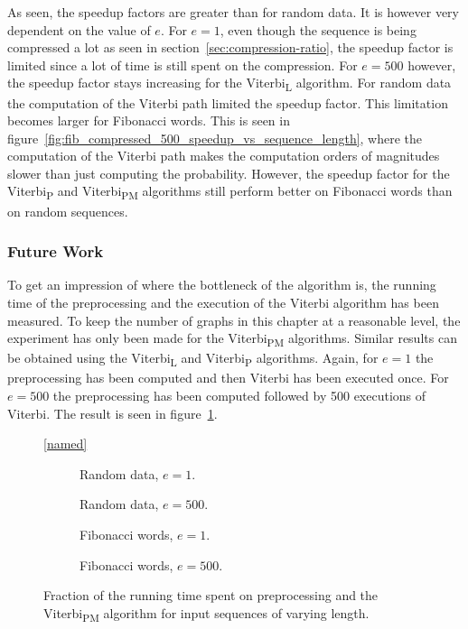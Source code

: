 As seen, the speedup factors are greater than for random data. It is however
very dependent on the value of $e$. For $e = 1$, even though the sequence is
being compressed a lot as seen in section~\ref{sec:compression-ratio}, the
speedup factor is limited since a lot of time is still spent on the
compression. For $e = 500$ however, the speedup factor stays increasing for the
Viterbi\textsubscript{L} algorithm. For random data the computation of the
Viterbi path limited the speedup factor. This limitation becomes larger for
Fibonacci words. This is seen in
figure~\ref{fig:fib_compressed_500_speedup_vs_sequence_length}, where the
computation of the Viterbi path makes the computation orders of magnitudes
slower than just computing the probability. However, the speedup factor for the
Viterbi\textsubscript{P} and Viterbi\textsubscript{PM} algorithms still perform
better on Fibonacci words than on random sequences.

\subsubsection{Future Work}

To get an impression of where the bottleneck of the algorithm is, the running
time of the preprocessing and the execution of the Viterbi algorithm has been
measured. To keep the number of graphs in this chapter at a reasonable level,
the experiment has only been made for the Viterbi\textsubscript{PM} algorithms.
Similar results can be obtained using the Viterbi\textsubscript{L} and
Viterbi\textsubscript{P} algorithms. Again, for $e = 1$ the preprocessing has
been computed and then Viterbi has been executed once. For $e = 500$ the
preprocessing has been computed followed by 500 executions of Viterbi. The
result is seen in figure~\ref{fig:pre_vs_running}.

\begin{figure}
  \centering\ref{named}
  \begin{subfigure}{0.5\textwidth}
    \centering 
    \caption{Random data, $e = 1$.}
  \end{subfigure}%
  \begin{subfigure}{0.5\textwidth}
    \centering 
    \caption{Random data, $ e = 500$.}
  \end{subfigure}

  \begin{subfigure}{0.5\textwidth}
    \centering 
    \caption{Fibonacci words, $e = 1$.}
  \end{subfigure}%
  \begin{subfigure}{0.5\textwidth}
    \centering 
    \caption{Fibonacci words, $ e = 500$.}
  \end{subfigure}
  \caption{Fraction of the running time spent on preprocessing and the
    Viterbi\textsubscript{PM} algorithm for input sequences of varying length.}
  \label{fig:pre_vs_running}
\end{figure}

